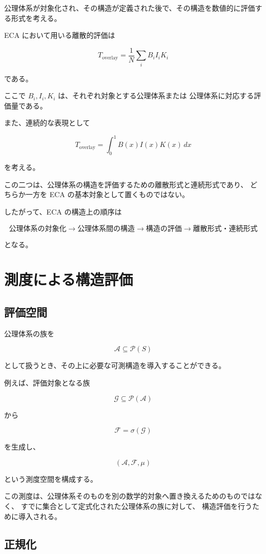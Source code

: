 \documentclass[12pt,a4paper]{article}
\begin{document}
公理体系が対象化され、その構造が定義された後で、その構造を数値的に評価する形式を考える。

ECA において用いる離散的評価は

\[
T_{\mathrm{overlay}}
=
\frac{1}{N}
\sum_i B_iI_iK_i
\]

である。

ここで $B_i,I_i,K_i$ は、それぞれ対象とする公理体系または
公理体系に対応する評価量である。

また、連続的な表現として

\[
T_{\mathrm{overlay}}
=
\int_0^1 B(x)I(x)K(x)\,dx
\]

を考える。

この二つは、公理体系の構造を評価するための離散形式と連続形式であり、
どちらか一方を ECA の基本対象として置くものではない。

したがって、ECA の構造上の順序は

\[
\boxed{
\text{公理体系の対象化}
\rightarrow
\text{公理体系間の構造}
\rightarrow
\text{構造の評価}
\rightarrow
\text{離散形式・連続形式}
}
\]

となる。

\section{測度による構造評価}

\subsection{評価空間}

公理体系の族を

\[
\mathscr{A}\subseteq\mathcal{P}(S)
\]

として扱うとき、その上に必要な可測構造を導入することができる。

例えば、評価対象となる族

\[
\mathcal{G}\subseteq\mathcal{P}(\mathscr{A})
\]

から

\[
\mathcal{F}=\sigma(\mathcal{G})
\]

を生成し、

\[
(\mathscr{A},\mathcal{F},\mu)
\]

という測度空間を構成する。

この測度は、公理体系そのものを別の数学的対象へ置き換えるためのものではなく、
すでに集合として定式化された公理体系の族に対して、
構造評価を行うために導入される。

\subsection{正規化}
\end{document}
